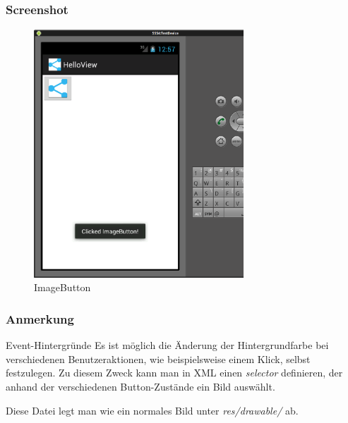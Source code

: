 \begin{frame}
   \frametitle{Screenshot}
	\begin{figure}[h!]
	  \centering
	  \includegraphics[width=0.7\textwidth]{pictures/imagebutton.ps}
	  \caption{
		  ImageButton
	  }
	  \label{fig:imagebutton}
	\end{figure}
\end{frame}

\begin{frame}
   \frametitle{Anmerkung}
	\begin{alertblock}{Event-Hintergründe}
		Es ist möglich die Änderung der Hintergrundfarbe 
		bei verschiedenen Benutzeraktionen, wie beispielsweise einem Klick, selbst 
		festzulegen. Zu diesem Zweck kann man in XML einen \emph{selector} 
		definieren, der anhand der verschiedenen Button-Zustände ein Bild auswählt.

		\vspace{3mm}

		

		\vspace{3mm}

		Diese Datei legt man wie ein normales Bild unter \emph{res/drawable/} ab.
	\end{alertblock}
\end{frame}

